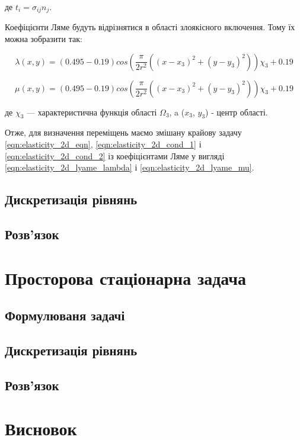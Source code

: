 \noindent де $t_i = \sigma_{ij}n_j$.

Коефіцієнти Ляме будуть відрізнятися в області злоякісного включення. Тому їх можна зобразити так:

\begin{equation}
    \label{eqn:elasticity_2d_lyame_lambda}
    \lambda(x, y) = (0.495 - 0.19)cos(\frac{\pi}{2r^2}((x - x_3)^2 + (y - y_3)^2))\chi_3 + 0.19
\end{equation}

\begin{equation}
    \label{eqn:elasticity_2d_lyame_mu}
    \mu(x, y) = (0.495 - 0.19)cos(\frac{\pi}{2r^2}((x - x_3)^2 + (y - y_3)^2))\chi_3 + 0.19
\end{equation}

\noindent де $\chi_3$ --- характеристична функція області $\Omega_3$, a ($x_3$, $y_3$) - центр області.

Отже, для визначення переміщень маємо змішану крайову задачу \ref{eqn:elasticity_2d_eqn}, \ref{eqn:elasticity_2d_cond_1} 
і \ref{eqn:elasticity_2d_cond_2} із коефіцієнтами Ляме у вигляді \ref{eqn:elasticity_2d_lyame_lambda} і 
\ref{eqn:elasticity_2d_lyame_mu}.

\subsection{Дискретизація рівнянь}

\subsection{Розв'язок}

\section{Просторова стаціонарна задача}

\subsection{Формулюваня задачі}

\subsection{Дискретизація рівнянь}

\subsection{Розв'язок}

\section{Висновок}
